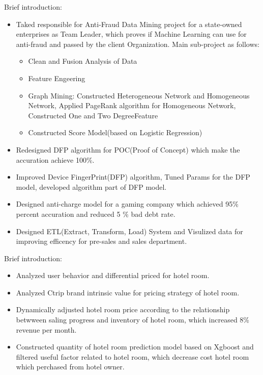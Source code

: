 \documentclass{resume}
\begin{document}
Brief introduction: 
\begin{itemize}
   \item Taked responsible for Anti-Fraud Data Mining project for a state-owned enterprises as Team Leader, which proves if Machine Learning can use for anti-fraud and passed by the client Organization. Main sub-project as follows:
   \begin{itemize}
       \item Clean and Fusion Analysis of Data
       \item Feature Engeering
       \item Graph Mining: Constructed Heterogeneous Network and Homogeneous Network, Applied PageRank algorithm for Homogeneous Network, Constructed One and Two DegreeFeature 
       \item Constructed Score Model(based on Logistic Regression)
   \end{itemize}
   \item Redesigned DFP algorithm for POC(Proof of Concept) which make the accuration achieve 100\%.
   \item Improved Device FingerPrint(DFP) algorithm, Tuned Params for the DFP model, developed algorithm part of DFP model.
   \item Designed anti-charge model for a gaming company which achieved 95\% percent accuration and reduced 5 \% bad debt rate.
   \item Designed ETL(Extract, Transform, Load) System and Visulized data for improving efficency for pre-sales and sales department. 
\end{itemize}

Brief introduction:
\begin{itemize}
  \item Analyzed user behavior and differential priced for hotel room.
  \item Analyzed Ctrip brand intrinsic value for pricing strategy of hotel room.
  \item Dynamically adjusted hotel room price according to the relationship betwween saling progress and inventory of hotel room, which increased 8\% revenue per month.
  \item Constructed quantity of hotel room prediction model based on Xgboost and filtered useful factor related to hotel room, which decrease cost hotel room which perchased from hotel owner.
\end{itemize}
\end{document}
